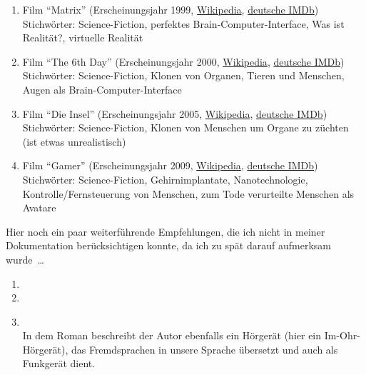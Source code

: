 \begin{enumerate}
	\item Film \enquote{Matrix}
		(Erscheinungsjahr 1999, \href{http://de.wikipedia.org/wiki/Matrix_(Film)}{Wikipedia},
		\href{http://www.imdb.de/title/tt0133093/}{deutsche IMDb}) \\
		Stichwörter: Science-Fiction, perfektes Brain-Computer-Interface,
		Was ist Realität?, virtuelle Realität
	\item Film \enquote{The 6th Day}
		(Erscheinungsjahr 2000, \href{http://de.wikipedia.org/wiki/The_6th_Day}{Wikipedia},
		\href{http://www.imdb.de/title/tt0216216/}{deutsche IMDb}) \\
		Stichwörter: Science-Fiction, Klonen von Organen, Tieren und Menschen,
			Augen als Brain-Computer-Interface
	\item Film \enquote{Die Insel}
		(Erscheinungsjahr 2005, \href{http://de.wikipedia.org/wiki/Die_Insel_(2005)}{Wikipedia},
		\href{http://www.imdb.de/title/tt0399201/}{deutsche IMDb}) \\
		Stichwörter: Science-Fiction, Klonen von Menschen um Organe zu züchten
			(ist etwas unrealistisch)
	\item Film \enquote{Gamer}
		(Erscheinungsjahr 2009, \href{http://de.wikipedia.org/wiki/Gamer}{Wikipedia},
		\href{http://www.imdb.de/title/tt1034032/}{deutsche IMDb}) \\
		Stichwörter: Science-Fiction, Gehirnimplantate, Nanotechnologie,
			Kontrolle/Fernsteuerung von Menschen,
			zum Tode verurteilte Menschen als Avatare
\end{enumerate}

\bigskip
Hier noch ein paar weiterführende Empfehlungen, die ich nicht in meiner Dokumentation
berücksichtigen konnte, da ich zu spät darauf aufmerksam wurde~\dots
\begin{enumerate}
	\item {}
	\item {}
	\item {} \\
		In dem Roman beschreibt der Autor ebenfalls ein Hörgerät (hier ein Im-Ohr-Hörgerät),
		das Fremdsprachen in unsere Sprache übersetzt und auch als Funkgerät dient.
\end{enumerate}



